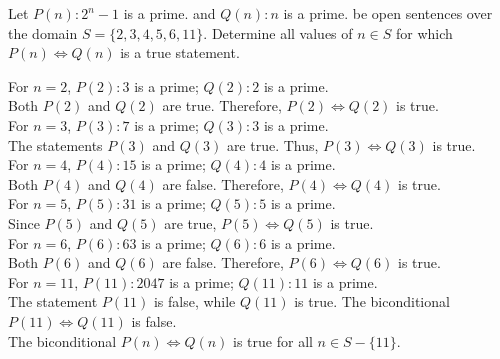 \documentclass[12pt]{article}
\newenvironment{problem}[2][Problem]{\begin{trivlist}
		\item[\hskip \labelsep {\bfseries #1}\hskip \labelsep {\bfseries #2.}]}{\end{trivlist}}
\newenvironment{solution}[2][Solution]{\begin{trivlist}
		\item[\hskip \labelsep {\bfseries #1}\hskip \labelsep {\bfseries #2.}]}{\end{trivlist}}
\begin{document}
\begin{problem}{45}
	Let $P(n):2^{n}-1$ is a prime. and $Q(n):n$ is a prime. be open sentences over the domain $S = \{2,3,4,5,6,11\}$. Determine all values of $n \in S$ for which $P(n) \Leftrightarrow Q(n)$ is a true statement.
	\begin{solution}{}
		For $n=2$, $P(2):3$ is a prime; $Q(2):2$ is a prime.\\
		Both $P(2)$ and $Q(2)$ are true. Therefore, $P(2) \Leftrightarrow Q(2)$ is true.\\
		
		\noindent For $n = 3$, $P(3):7$ is a prime; $Q(3):3$ is a prime.\\
		The statements $P(3)$ and $Q(3)$ are true. Thus, $P(3) \Leftrightarrow Q(3)$ is true.\\
		
		\noindent For $n = 4$, $P(4):15$ is a prime; $Q(4):4$ is a prime.\\
		Both $P(4)$ and $Q(4)$ are false. Therefore, $P(4) \Leftrightarrow Q(4)$ is true.\\
		
		\noindent For $n = 5$, $P(5):31$ is a prime; $Q(5):5$ is a prime.\\
		Since $P(5)$ and $Q(5)$ are true, $P(5) \Leftrightarrow Q(5)$ is true.\\
		
		\noindent For $n = 6$, $P(6):63$ is a prime; $Q(6):6$ is a prime.\\
		Both $P(6)$ and $Q(6)$ are false. Therefore, $P(6) \Leftrightarrow Q(6)$ is true.\\
		
		\noindent For $n = 11$, $P(11):2047$ is a prime; $Q(11):11$ is a prime.\\
		The statement $P(11)$ is false, while $Q(11)$ is true. The biconditional $P(11) \Leftrightarrow Q(11)$ is false.\\ 
		The biconditional $P(n) \Leftrightarrow Q(n)$ is true for all $n \in S - \{11\}$.\\
	\end{solution}
\end{problem}
\end{document}

